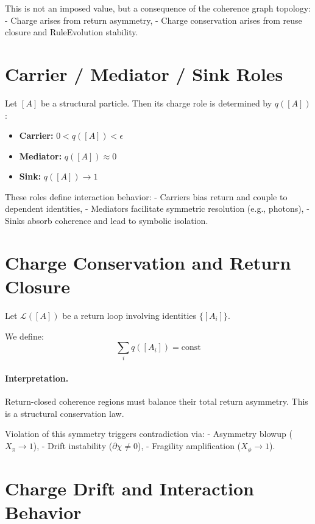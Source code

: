 This is not an imposed value, but a consequence of the coherence graph topology:
- Charge arises from return asymmetry,
- Charge conservation arises from reuse closure and RuleEvolution stability.

\section{Carrier / Mediator / Sink Roles} \label{sec:charge-roles}

Let $[A]$ be a structural particle. Then its charge role is determined by $q([A])$:

\begin{itemize}
  \item \textbf{Carrier:} $0 < q([A]) < \epsilon$
  \item \textbf{Mediator:} $q([A]) \approx 0$
  \item \textbf{Sink:} $q([A]) \to 1$
\end{itemize}

These roles define interaction behavior:
- Carriers bias return and couple to dependent identities,
- Mediators facilitate symmetric resolution (e.g., photons),
- Sinks absorb coherence and lead to symbolic isolation.

\section{Charge Conservation and Return Closure} \label{sec:charge-conservation}

Let $\mathcal{L}([A])$ be a return loop involving identities $\{[A_i]\}$.

We define:
\begin{equation}
\sum_{i} q([A_i]) = \text{const}
\end{equation}

\paragraph{Interpretation.}
Return-closed coherence regions must balance their total return asymmetry. This is a structural conservation law.

Violation of this symmetry triggers contradiction via:
- Asymmetry blowup ($X_\pi \to 1$),
- Drift instability ($\partial\chi \ne 0$),
- Fragility amplification ($X_\phi \to 1$).

\section{Charge Drift and Interaction Behavior} \label{sec:charge-drift}

